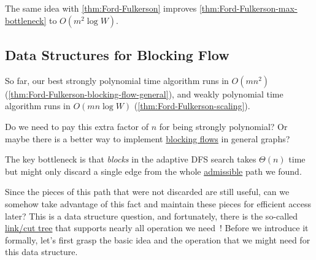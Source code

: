 \begin{remark}
	The same idea with \autoref{thm:Ford-Fulkerson} improves \autoref{thm:Ford-Fulkerson-max-bottleneck} to \(O(m^2 \log W)\).
\end{remark}

\subsection{Data Structures for Blocking Flow}
So far, our best strongly polynomial time algorithm runs in \(O(mn^2)\) (\autoref{thm:Ford-Fulkerson-blocking-flow-general}), and weakly polynomial time algorithm runs in \(O(mn \log W)\) (\autoref{thm:Ford-Fulkerson-scaling}).

\begin{problem*}
	Do we need to pay this extra factor of \(n\) for being strongly polynomial? Or maybe there is a better way to implement \hyperref[def:blocking-flow]{blocking flows} in general graphs?
\end{problem*}

\begin{prev}
	The key bottleneck is that \emph{blocks} in the adaptive DFS search takes \(\Theta (n)\) time but might only discard a single edge from the whole \hyperref[def:admissible]{admissible} path we found.
\end{prev}

Since the pieces of this path that were not discarded are still useful, can we somehow take advantage of this fact and maintain these pieces for efficient access later? This is a data structure question, and fortunately, there is the so-called \hyperref[def:link-cut-tree]{link/cut tree} that supports nearly all operation we need~\cite{sleator1985self}! Before we introduce it formally, let's first grasp the basic idea and the operation that we might need for this data structure.

